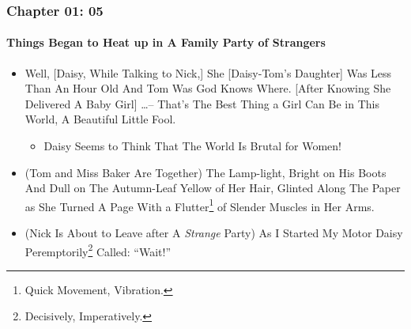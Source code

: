 \begin{frame}
\frametitle{Chapter 01: 05}
\framesubtitle{Things Began to Heat up in A Family Party of Strangers}
\label{slide:chapter-01-05}
\begin{itemize}
\item Well, [Daisy, While Talking to Nick,] She [Daisy-Tom's Daughter] Was Less Than An Hour Old And Tom Was God Knows Where. [After Knowing She Delivered A Baby Girl] \dots -- That's The Best Thing a Girl Can Be in This World, \alert{A Beautiful Little Fool.}
\begin{itemize}
\pause \item Daisy Seems to Think That The World Is Brutal for Women!
\end{itemize}
\pause \item (Tom and Miss Baker Are Together) The Lamp-light, Bright on His Boots And Dull on The Autumn-Leaf Yellow of Her Hair, Glinted Along The Paper as She Turned A Page With a Flutter\footnote{Quick Movement, Vibration.} of Slender Muscles in Her Arms. 
\pause \item (Nick Is About to Leave after A \textit{Strange} Party) As I Started My Motor Daisy Peremptorily\footnote{Decisively, Imperatively.} Called: ``Wait!''
\end{itemize}
\end{frame}
